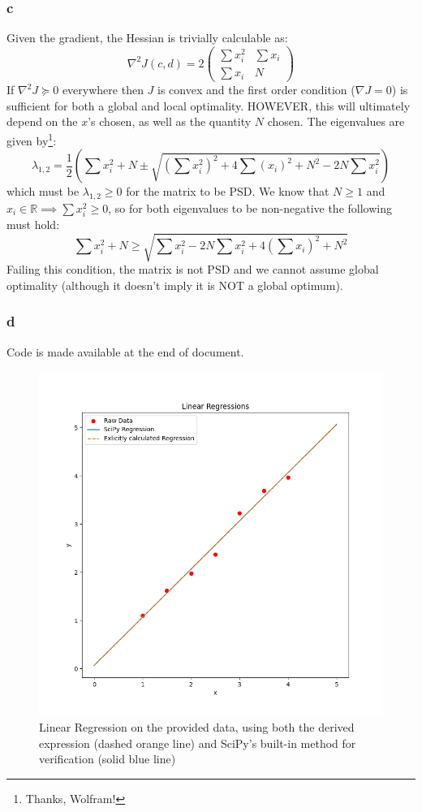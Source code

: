 \documentclass[11pt]{report}
\theoremstyle{definition}
\begin{document}
\subsubsection*{c}
Given the gradient, the Hessian is trivially calculable as:
\[
	\nabla^2 J(c,d) = 2\begin{pmatrix}
		\sum x_i^2 & \sum x_i \\
		\sum x_i   & N
	\end{pmatrix}
\]
If $\nabla^2 J \succcurlyeq 0$ everywhere then $J$ is convex and the first order
condition ($\nabla J = 0$) is sufficient for both a global and local optimality.
HOWEVER, this will ultimately depend on the $x$'s chosen, as well as the
quantity $N$ chosen. The eigenvalues are given by\footnote{Thanks, Wolfram!}:
\[
	\lambda_{1,2}
	= \frac{1}{2}
	\left(
	\sum x_i^2 + N \pm \sqrt{(\sum x_i^2)^2+4\sum (x_i)^2 +N^2-2N\sum x_i^2}
	\right)
\]
which must be $\lambda_{1,2} \geq 0$ for the matrix to be PSD. We know that
$N\geq1$ and $x_i\in\mathbb{R}\implies \sum x_i^2 \geq 0$, so for both
eigenvalues to be non-negative the following must hold:
\[\sum x_i^2 + N \geq \sqrt{\sum x_i^2 - 2N\sum x_i^2+4\left(\sum x_i\right)^2 + N^2}\]
Failing this condition, the matrix is not PSD and we cannot assume global
optimality (although it doesn't imply it is NOT a global optimum).

\newpage
\subsubsection*{d}
Code is made available at the end of document.
\begin{figure}[!h]
	\centering
	\includegraphics[width=\textwidth]{plots/hw3_regression.png}
	\caption{Linear Regression on the provided data, using both the derived
		expression (dashed orange line) and SciPy's built-in method for verification
		(solid blue line)}
\end{figure}
\end{document}
